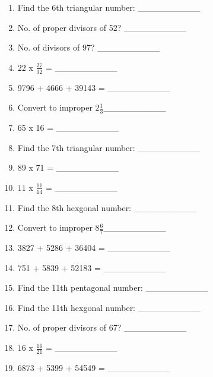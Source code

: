 \documentclass{article}
\begin{document}
\begin{multicols}{2}
\begin{enumerate}
\item Find the 6th triangular number:  \_\_\_\_\_\_\_\_\_\_ \\ 
\item No. of proper divisors of 52? \_\_\_\_\_\_\_\_\_\_ \\ 
\item No. of divisors of 97? \_\_\_\_\_\_\_\_\_\_ \\ 
\item $22$ x $\frac{27}{32}$ = \_\_\_\_\_\_\_\_\_\_ \\ 
\item 9796 + 4666 + 39143 = \_\_\_\_\_\_\_\_\_\_ \\ 
\item Convert to improper $2\frac{1}{3}$\_\_\_\_\_\_\_\_\_\_ \\ 
\item 65 x 16 = \_\_\_\_\_\_\_\_\_\_ \\ 
\item Find the 7th triangular number:  \_\_\_\_\_\_\_\_\_\_ \\ 
\item 89 x 71 = \_\_\_\_\_\_\_\_\_\_ \\ 
\item $11$ x $\frac{11}{14}$ = \_\_\_\_\_\_\_\_\_\_ \\ 
\item Find the 8th hexgonal number:  \_\_\_\_\_\_\_\_\_\_ \\ 
\item Convert to improper $8\frac{6}{7}$\_\_\_\_\_\_\_\_\_\_ \\ 
\item 3827 + 5286 + 36404 = \_\_\_\_\_\_\_\_\_\_ \\ 
\item 751 + 5839 + 52183 = \_\_\_\_\_\_\_\_\_\_ \\ 
\item Find the 11th pentagonal number:  \_\_\_\_\_\_\_\_\_\_ \\ 
\item Find the 11th hexgonal number:  \_\_\_\_\_\_\_\_\_\_ \\ 
\item No. of proper divisors of 67? \_\_\_\_\_\_\_\_\_\_ \\ 
\item $16$ x $\frac{16}{21}$ = \_\_\_\_\_\_\_\_\_\_ \\ 
\item 6873 + 5399 + 54549 = \_\_\_\_\_\_\_\_\_\_ \\ 

\end{enumerate}
\end{multicols}
\end{document}
